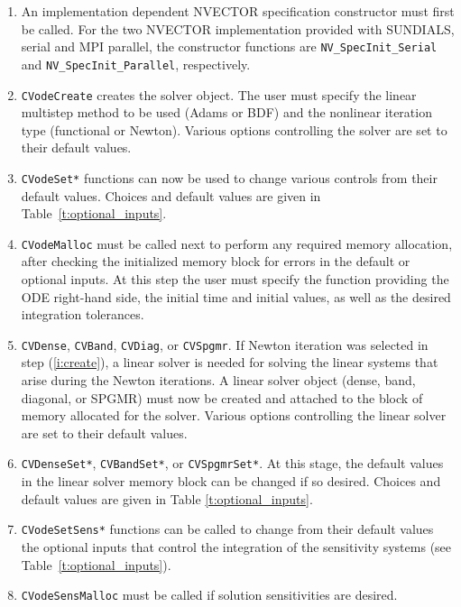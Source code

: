 \begin{enumerate}
\item \label{i:nvspec}
  An implementation dependent NVECTOR specification constructor must first
  be called. For the two NVECTOR implementation provided with SUNDIALS, serial
  and MPI parallel, the constructor functions are {\tt NV\_SpecInit\_Serial}
  and {\tt NV\_SpecInit\_Parallel}, respectively.
\item \label{i:create}
  {\tt CVodeCreate} 
  creates the solver object.
  The user must specify the linear multistep method to be used 
  (Adams or BDF) and the nonlinear iteration type (functional or Newton).
  Various options controlling the solver are set to their default values.
\item \label{i:set}
  {\tt CVodeSet*} 
  functions can now be used to change various controls from their default values.
  Choices and default values are given in Table~\ref{t:optional_inputs}.
\item \label{i:malloc}
  {\tt CVodeMalloc}
  must be called next to perform any required memory allocation, after checking 
  the initialized memory block for errors in the default or optional inputs. 
  At this step the user must specify the function providing the ODE right-hand 
  side, the initial time and initial values, as well as the desired
  integration tolerances.
\item \label{i:linear}
  {\tt CVDense}, {\tt CVBand}, {\tt CVDiag}, or {\tt CVSpgmr}.
  If Newton iteration was selected in step (\ref{i:create}), a linear solver  
  is needed for solving the linear systems that arise during the Newton iterations. 
  A linear solver object (dense, band, diagonal, or SPGMR) must now be created
  and attached to the block of memory allocated for the solver.
  Various options controlling the linear solver are set to their default values.
\item \label{i:ls_set}
  {\tt CVDenseSet*}, {\tt CVBandSet*}, or {\tt CVSpgmrSet*}.
  At this stage, the default values in the linear solver memory block can be
  changed if so desired. 
  Choices and default values are given in Table \ref{t:optional_inputs}.
\item \label{i:sensi_set}
  {\tt CVodeSetSens*}
  functions can be called to change from their default values the optional inputs
  that control the integration of the sensitivity systems 
  (see Table~\ref{t:optional_inputs}).
\item \label{i:sensi_malloc} 
  {\tt CVodeSensMalloc}
  must be called if solution sensitivities are desired.

\end{enumerate}
